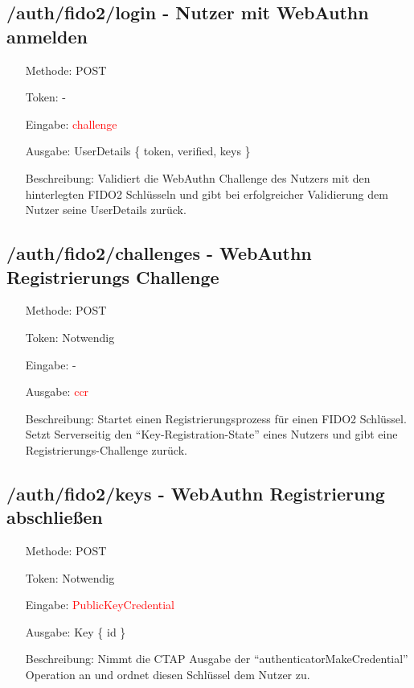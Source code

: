 \documentclass[journal]{IEEEtran}
\begin{document}
\subsection{/auth/fido2/login - Nutzer mit WebAuthn anmelden}

\begin{itemize}
	\setlength{\leftskip}{1.5cm}
	\setlength{\itemsep}{0pt}
	\item[Methode:] POST
	\item[Token:] -
	\item[Eingabe:] \textcolor{red}{challenge}
	\item[Ausgabe:] UserDetails \{ token, verified, keys \}
	\item[Beschreibung:] Validiert die WebAuthn Challenge des Nutzers mit den
		hinterlegten FIDO2 Schlüsseln und gibt bei erfolgreicher Validierung
		dem Nutzer seine UserDetails zurück.
\end{itemize}

\subsection{/auth/fido2/challenges - WebAuthn Registrierungs Challenge}

\begin{itemize}
	\setlength{\leftskip}{1.5cm}
	\setlength{\itemsep}{0pt}
	\item[Methode:] POST
	\item[Token:] Notwendig
	\item[Eingabe:] -
	\item[Ausgabe:] \textcolor{red}{ccr}
	\item[Beschreibung:] Startet einen Registrierungsprozess für einen FIDO2
		Schlüssel. Setzt Serverseitig den ``Key-Registration-State'' eines
		Nutzers und gibt eine Registrierungs-Challenge zurück.
\end{itemize}

\subsection{/auth/fido2/keys - WebAuthn Registrierung abschließen}

\begin{itemize}
	\setlength{\leftskip}{1.5cm}
	\setlength{\itemsep}{0pt}
	\item[Methode:] POST
	\item[Token:] Notwendig
	\item[Eingabe:] \textcolor{red}{PublicKeyCredential}
	\item[Ausgabe:] Key \{ id \}
	\item[Beschreibung:] Nimmt die CTAP Ausgabe der
		``authenticatorMakeCredential'' Operation an und ordnet diesen
		Schlüssel dem Nutzer zu.
\end{itemize}
\end{document}
